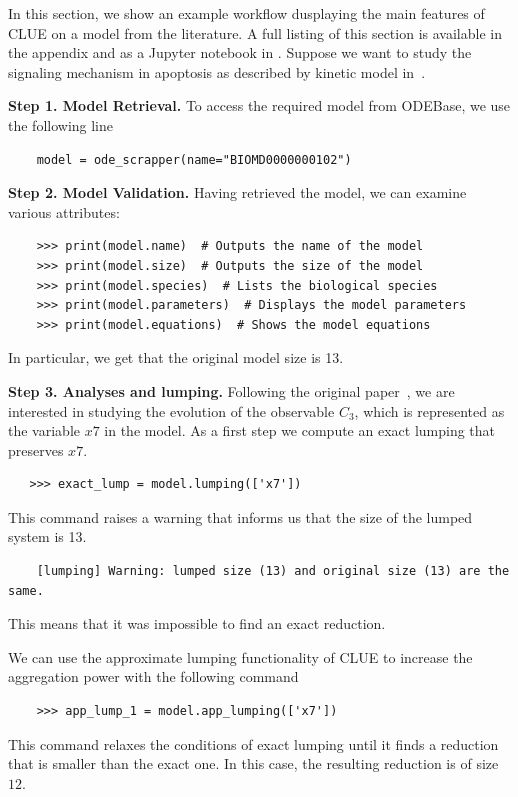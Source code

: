 In this section, we show an example workflow dusplaying the main features of CLUE on a model from the literature.
A full listing of this section is available in the appendix and as a Jupyter notebook in \RepoURL.
Suppose we want to study the signaling mechanism in apoptosis as described by kinetic model in~\cite{legewie_mathematical_2006}.

\textbf{Step 1. Model Retrieval.}
To access the required model from ODEBase, we use the following line
\begin{verbatim}
    model = ode_scrapper(name="BIOMD0000000102")
\end{verbatim}

\textbf{Step 2. Model Validation.}
Having retrieved the model, we can examine various attributes:
\begin{verbatim}
    >>> print(model.name)  # Outputs the name of the model
    >>> print(model.size)  # Outputs the size of the model
    >>> print(model.species)  # Lists the biological species
    >>> print(model.parameters)  # Displays the model parameters 
    >>> print(model.equations)  # Shows the model equations
\end{verbatim}
In particular, we get that the original model size is 13.

\textbf{Step 3. Analyses and lumping.}
Following the original paper~\cite{legewie_mathematical_2006}, we are interested in studying the evolution of the observable $C_3$, which is represented as the variable $x7$ in the model.
As a first step we compute an exact lumping that preserves $x7$.
\begin{verbatim}
   >>> exact_lump = model.lumping(['x7'])
\end{verbatim}
This command raises a warning that informs us that the size of the lumped system is 13.
\begin{verbatim}
    [lumping] Warning: lumped size (13) and original size (13) are the same.
\end{verbatim}
This means that it was impossible to find an exact reduction.

We can use the approximate lumping functionality of CLUE to increase the aggregation power with the following command 
\begin{verbatim}
    >>> app_lump_1 = model.app_lumping(['x7'])
\end{verbatim}
This command relaxes the conditions of exact lumping until it finds a reduction that is smaller than the exact one.
In this case, the resulting reduction is of size $12$. 


